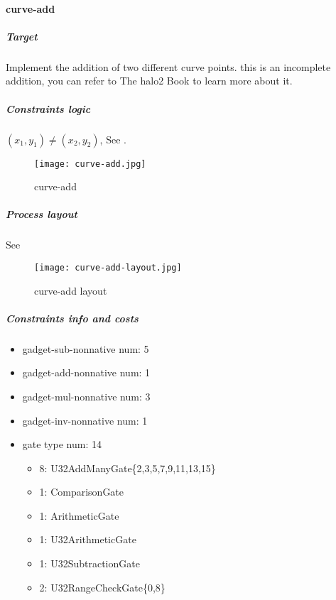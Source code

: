 \paragraph{curve-add}

\subparagraph{Target}
Implement the addition of two different curve points. this is an incomplete addition, you can refer to The halo2 Book\cite{website:halo2-book} to learn more about it.

\subparagraph{Constraints logic}
$(x_1,y_1) \ne (x_2,y_2)$, See .
\begin{figure}[!ht]
    \centering
    \texttt{[image: curve-add.jpg]}
    \caption{curve-add}
    \label{fig:curve-add}
\end{figure}

\subparagraph{Process layout}
See 
\begin{figure}[!ht]
    \centering
    \texttt{[image: curve-add-layout.jpg]}
    \caption{curve-add layout}
    \label{fig:curve-add-layout}
\end{figure}

\subparagraph{Constraints info and costs}
\begin{itemize}
    \item gadget-sub-nonnative num: 5
    \item gadget-add-nonnative num: 1
    \item gadget-mul-nonnative num: 3
    \item gadget-inv-nonnative num: 1
    \item gate type num: 14
        \begin{itemize}
            \item 8: U32AddManyGate\{2,3,5,7,9,11,13,15\}
            \item 1: ComparisonGate
            \item 1: ArithmeticGate
            \item 1: U32ArithmeticGate
            \item 1: U32SubtractionGate
            \item 2: U32RangeCheckGate\{0,8\}
        \end{itemize}
\end{itemize}
